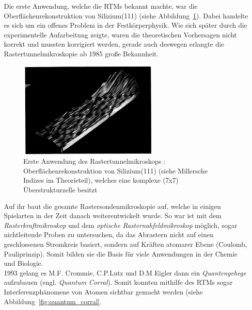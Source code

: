 Die erste Anwendung, welche die RTMs bekannt
machte, war die Oberflächenrekonstruktion von Silizium(111)  
\cite{binnig19837} (siehe Abbildung~\ref{fig:silicium}).
Dabei handelte es sich um ein offenes Problem in der
Festkörperphysik. Wie sich später durch die experimentelle
Aufarbeitung zeigte, waren die theoretischen Vorhersagen nicht 
korrekt und mussten korrigiert werden, gerade auch deswegen
erlangte die Rastertunnelmikroskopie ab 1985 große Bekannheit.
\begin{figure}
\includegraphics[width=7cm]{pics/silicium}
\caption{Erste Anwendung des Rastertunnelmikroskops 
\cite{binnig19837}: 
Oberflächenrekonstruktion von Silizium(111) (siehe Millersche
Indizes im Theorieteil), welches eine komplexe (7x7) 
Überstrukturzelle besitzt}
 \label{fig:silicium}
\end{figure}

Auf ihr baut die gesamte Rastersondenmikroskopie auf, welche
in einigen Spielarten in der Zeit danach weiterentwickelt wurde.
So war ist mit dem \textit{Rasterkraftmikroskop}
und dem \textit{optische Rasternahfeldmikroskop} möglich, sogar
nichtleitende Proben zu untersuchen, da das Abrastern nicht auf
einen geschlossenen Stromkreis basiert, sondern auf Kräften 
atomarer Ebene (Coulomb, Pauliprinzip). Somit bilden sie die Basis
für viele Anwendungen in der Chemie und Biologie.\\
1993 gelang es M.F. Crommie, C.P.Lutz und
D.M Eigler \cite{crommie1993imaging} dann
ein \textit{Quantengehege} aufzubauen
(engl. \textit{Quantum Corral}). Somit konnten mithilfe
des RTMs sogar Interferenzphänomene von Atomen
sichtbar gemacht werden (siehe Abbildung~\ref{fig:quantum_corral}. 

